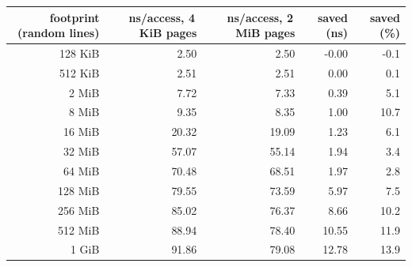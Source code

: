 \begin{tabular}{rrrrr}
\toprule
footprint (random lines) & ns/access, 4\,KiB pages & ns/access, 2\,MiB pages & saved (ns) & saved (\%) \\
\midrule
128 KiB & 2.50 & 2.50 & -0.00 & -0.1 \\
512 KiB & 2.51 & 2.51 & 0.00 & 0.1 \\
2 MiB & 7.72 & 7.33 & 0.39 & 5.1 \\
8 MiB & 9.35 & 8.35 & 1.00 & 10.7 \\
16 MiB & 20.32 & 19.09 & 1.23 & 6.1 \\
32 MiB & 57.07 & 55.14 & 1.94 & 3.4 \\
64 MiB & 70.48 & 68.51 & 1.97 & 2.8 \\
128 MiB & 79.55 & 73.59 & 5.97 & 7.5 \\
256 MiB & 85.02 & 76.37 & 8.66 & 10.2 \\
512 MiB & 88.94 & 78.40 & 10.55 & 11.9 \\
1 GiB & 91.86 & 79.08 & 12.78 & 13.9 \\
\bottomrule
\end{tabular}
